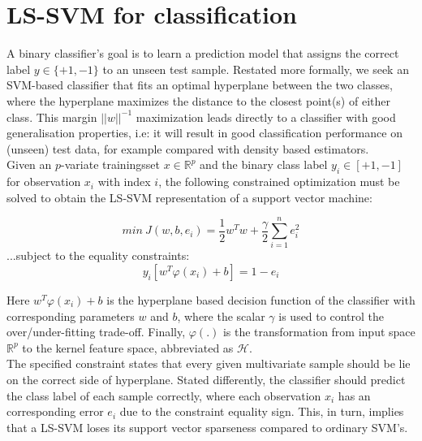 \documentclass[preprint,12pt]{elsarticle}
\begin{document}
\section{LS-SVM for classification}
A binary classifier's goal is to learn a prediction model that assigns the correct label $y \in \{+1, -1\}$ to an unseen test sample. Restated more formally, we seek an SVM-based classifier that fits an optimal hyperplane between the two classes, where the hyperplane maximizes the distance to the closest point(s) of either class. This margin $||w||^{-1}$ maximization leads directly to a classifier with good generalisation properties, i.e: it will result in good classification performance on (unseen) test data, for example compared with density based estimators. \\


Given an $p$-variate trainingsset $x \in \mathbb{R}^p$ and the binary class label $y_i \in[+1,-1]$ for observation $x_i$ with index $i$, the following constrained optimization must be solved to obtain the LS-SVM representation of a support vector machine:

\begin{equation}
min \  J(w,b,e_i) = \frac{1}{2} w^T w + \frac{\gamma}{2} \sum_{i=1}^{n} e_i^2
\label{eq:costfunction}
\end{equation}
...subject to the equality constraints:
\begin{equation}
y_i[w^T \varphi(x_i) + b] = 1-e_i
\label{eq:lsconstraint}
\end{equation}

Here $w^T \varphi(x_i) + b$ is the hyperplane based decision function of the classifier with corresponding parameters $w$ and $b$, where the scalar $\gamma$ is used to control the over/under-fitting trade-off. Finally,  $\varphi(.)$ is the transformation from input space $\mathbb{R}^p$ to the kernel feature space, abbreviated as $\mathcal{H}$. \\

The specified constraint states that every given multivariate sample should be lie on the correct side of hyperplane. Stated differently, the classifier should predict the class label of each sample correctly, where each observation $x_i$ has an corresponding error $e_i$ due to the constraint equality sign. This, in turn, implies that a LS-SVM loses its support vector sparseness compared to ordinary SVM's. \\
\end{document}
